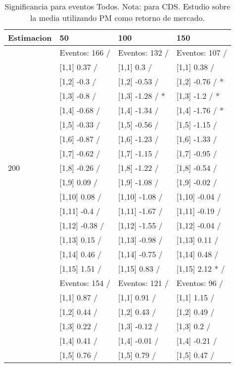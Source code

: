\begin{table}

\caption{Significancia para eventos Todos. Nota: para CDS. Estudio sobre la media utilizando PM como retorno de mercado.}
\centering
\begin{tabular}[t]{llll}
\toprule
Estimacion & 50 & 100 & 150\\
\midrule
 & Eventos:  166 / & Eventos:  132 / & Eventos:  107 /\\
 & {}[1,1] 0.37  / & {}[1,1] 0.3  / & {}[1,1] 0.38  /\\
 & {}[1,2] -0.3  / & {}[1,2] -0.53  / & {}[1,2] -0.76  / *\\
 & {}[1,3] -0.8  / & {}[1,3] -1.28  / * & {}[1,3] -1.2  / *\\
 & {}[1,4] -0.68  / & {}[1,4] -1.34  / & {}[1,4] -1.76  / *\\
\addlinespace
 & {}[1,5] -0.33  / & {}[1,5] -0.56  / & {}[1,5] -1.15  /\\
 & {}[1,6] -0.87  / & {}[1,6] -1.23  / & {}[1,6] -1.33  /\\
 & {}[1,7] -0.62  / & {}[1,7] -1.15  / & {}[1,7] -0.95  /\\
200 & {}[1,8] -0.26  / & {}[1,8] -1.22  / & {}[1,8] -0.54  /\\
 & {}[1,9] 0.09  / & {}[1,9] -1.08  / & {}[1,9] -0.02  /\\
\addlinespace
 & {}[1,10] 0.08  / & {}[1,10] -1.08  / & {}[1,10] -0.04  /\\
 & {}[1,11] -0.4  / & {}[1,11] -1.67  / & {}[1,11] -0.19  /\\
 & {}[1,12] -0.38  / & {}[1,12] -1.55  / & {}[1,12] -0.04  /\\
 & {}[1,13] 0.15  / & {}[1,13] -0.98  / & {}[1,13] 0.11  /\\
 & {}[1,14] 0.46  / & {}[1,14] -0.75  / & {}[1,14] 0.48  /\\
\addlinespace
 & {}[1,15] 1.51  / & {}[1,15] 0.83  / & {}[1,15] 2.12 * /\\
 & Eventos:  154 / & Eventos:  121 / & Eventos:  96 /\\
 & {}[1,1] 0.87  / & {}[1,1] 0.91  / & {}[1,1] 1.15  /\\
 & {}[1,2] 0.44  / & {}[1,2] 0.43  / & {}[1,2] 0.49  /\\
 & {}[1,3] 0.22  / & {}[1,3] -0.12  / & {}[1,3] 0.2  /\\
\addlinespace
 & {}[1,4] 0.41  / & {}[1,4] -0.01  / & {}[1,4] -0.21  /\\
 & {}[1,5] 0.76  / & {}[1,5] 0.79  / & {}[1,5] 0.47  /\\

\end{tabular}
\end{table}
